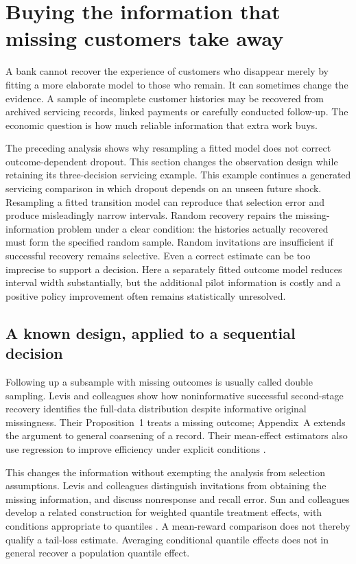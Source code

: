 \def\OutcomeAuditIntegrated{1}
\section{Buying the information that missing customers take away}
\label{closure30:outcome-audit}

A bank cannot recover the experience of customers who disappear merely by
fitting a more elaborate model to those who remain. It can sometimes change
the evidence. A sample of incomplete customer histories may be recovered from
archived servicing records, linked payments or carefully conducted follow-up.
The economic question is how much reliable information that extra work buys.

\ifdefined\OutcomeAuditIntegrated
The preceding analysis shows why resampling a fitted model does not correct
outcome-dependent dropout. This section changes the observation design while
retaining its three-decision servicing example.
\else
This example continues a generated servicing comparison in which dropout
depends on an unseen future shock. Resampling a fitted transition model can
reproduce that selection error and produce misleadingly narrow intervals.
\fi
Random recovery repairs the missing-information problem under a clear
condition: the histories actually recovered must form the specified random
sample. Random invitations are insufficient if successful recovery remains
selective. Even a correct estimate can be too imprecise to support a decision.
Here a separately fitted outcome model reduces interval width substantially,
but the additional pilot information is costly and a positive policy
improvement often remains statistically unresolved.

\subsection{A known design, applied to a sequential decision}
Following up a subsample with missing outcomes is usually called double
sampling. Levis and colleagues show how noninformative successful second-stage
recovery identifies the full-data distribution despite informative original
missingness. Their Proposition~1 treats a missing outcome; Appendix~A extends
the argument to general coarsening of a record. Their mean-effect estimators
also use regression to improve efficiency under explicit conditions
\citep{levis2023double}.

This changes the information without exempting the analysis from selection
assumptions. Levis and colleagues distinguish invitations from obtaining the
missing information, and discuss nonresponse and recall error. Sun and
colleagues develop a related construction for weighted quantile treatment
effects, with conditions appropriate to quantiles \citep{sun2025double}.
A mean-reward comparison does not thereby qualify a tail-loss estimate.
Averaging conditional quantile effects does not in general recover a
population quantile effect.

